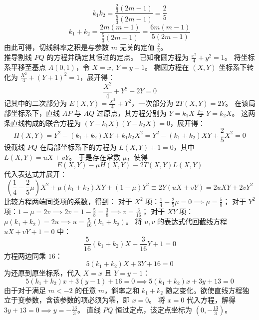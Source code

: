 \begin{solution}
$$ k_1 k_2 = \frac{\frac{2}{3}(2m - 1)}{\frac{5}{3}(2m - 1)} = \frac{2}{5} $$
$$ k_1 + k_2 = \frac{2m(m - 1)}{\frac{5}{3}(2m - 1)} = \frac{6m(m - 1)}{5(2m - 1)} $$
由此可得，切线斜率之积是与参数 $m$ 无关的定值 $\frac{2}{5}$。\\
推导割线 $PQ$ 的方程并确定其恒过的定点。
已知椭圆方程为 $\frac{x^2}{4} + y^2 = 1$。
将坐标系平移至基点 $A(0, 1)$，令 $X = x, \ Y = y - 1$。
椭圆方程在 $(X, Y)$ 坐标系下转化为 $\frac{X^2}{4} + (Y + 1)^2 = 1$，展开得：
$$ \frac{X^2}{4} + Y^2 + 2Y = 0 $$
记其中的二次部分为 $E(X,Y) = \frac{X^2}{4} + Y^2$，一次部分为 $2T(X,Y) = 2Y$。
在该局部坐标系下，直线 $AP$ 与 $AQ$ 过原点，其方程分别为 $Y = k_1 X$ 与 $Y = k_2 X$。
这两条直线构成的联合方程为 $(Y - k_1 X)(Y - k_2 X) = 0$，展开得：
$$ H(X,Y) = Y^2 - (k_1 + k_2)XY + k_1 k_2 X^2 = Y^2 - (k_1 + k_2)XY + \frac{2}{5}X^2 = 0 $$
设截线 $PQ$ 在局部坐标系下的方程为 $L(X, Y) + 1 = 0$，其中 $L(X, Y) = uX + vY$。
于是存在常数 $\mu$，使得
$$ E(X,Y) - \mu H(X,Y) \equiv 2T(X,Y) L(X,Y) $$
代入表达式并展开：
$$ \left(\frac{1}{4} - \frac{2}{5}\mu\right)X^2 + \mu(k_1 + k_2)XY + (1 - \mu)Y^2 \equiv 2Y(uX + vY) = 2uXY + 2vY^2 $$
比较方程两端同类项的系数，得到：
对于 $X^2$ 项：$\frac{1}{4} - \frac{2}{5}\mu = 0 \implies \mu = \frac{5}{8}$；
对于 $Y^2$ 项：$1 - \mu = 2v \implies 2v = 1 - \frac{5}{8} = \frac{3}{8} \implies v = \frac{3}{16}$；
对于 $XY$ 项：$\mu(k_1 + k_2) = 2u \implies u = \frac{5}{16}(k_1 + k_2)$。
将 $u, v$ 的表达式代回截线方程 $uX + vY + 1 = 0$ 中：
$$ \frac{5}{16}(k_1 + k_2)X + \frac{3}{16}Y + 1 = 0 $$
方程两边同乘 $16$：
$$ 5(k_1 + k_2)X + 3Y + 16 = 0 $$
为还原到原坐标系，代入 $X = x$ 且 $Y = y - 1$：
$$ 5(k_1 + k_2)x + 3(y - 1) + 16 = 0 \implies 5(k_1 + k_2)x + 3y + 13 = 0 $$
由于对于满足 $m < -2$ 的任意 $m$，斜率之和 $k_1 + k_2$ 随之变化。欲使直线方程独立于变参数，含该参数的项必须为零，即 $x = 0$。
将 $x = 0$ 代入方程，解得 $3y + 13 = 0 \implies y = -\frac{13}{3}$。
直线 $PQ$ 恒过定点，该定点坐标为 $\left(0, -\frac{13}{3}\right)$。
\end{solution}


